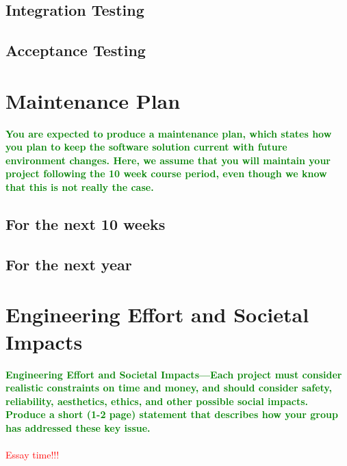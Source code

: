 \documentclass{article}
\numberwithin{equation}{section} %
\begin{document}
\subsection{Integration Testing}

\subsection{Acceptance Testing}

\section{Maintenance Plan}
\textcolor{green}{\bf You are expected to produce a maintenance plan, which 
states how you plan to keep the software solution current with future environment 
changes. Here, we assume that you will maintain your project following the 10 
week course  period, even though we know that this is not really the case. }

\subsection{For the next 10 weeks}

\subsection{For the next year}

\section{Engineering Effort and Societal Impacts}
\textcolor{green}{\bf Engineering Effort and Societal Impacts—Each project must consider realistic 
constraints on time and money, and should consider safety, reliability, aesthetics, 
ethics, and other possible social impacts. Produce a short (1-2 page) statement 
that describes how your group has addressed these key issue.} \\ \\
\textcolor{red}{Essay time!!!}
\end{document}
